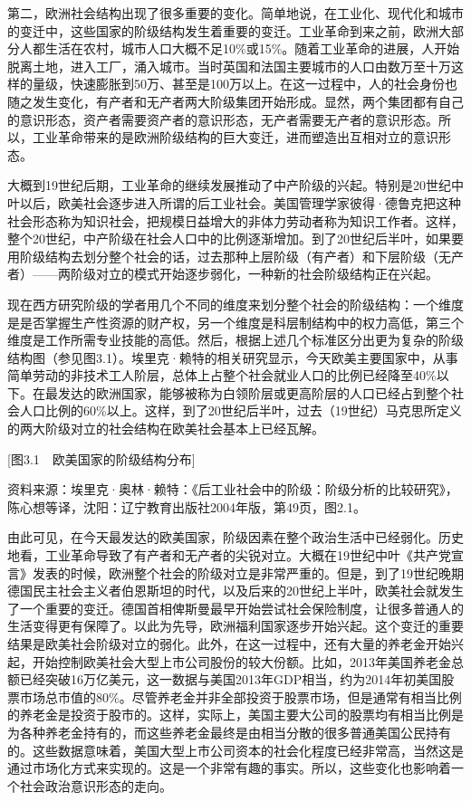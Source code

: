第二，欧洲社会结构出现了很多重要的变化。简单地说，在工业化、现代化和城市的变迁中，这些国家的阶级结构发生着重要的变迁。工业革命到来之前，欧洲大部分人都生活在农村，城市人口大概不足10\%或15\%。随着工业革命的进展，人开始脱离土地，进入工厂，涌入城市。当时英国和法国主要城市的人口由数万至十万这样的量级，快速膨胀到50万、甚至是100万以上。在这一过程中，人的社会身份也随之发生变化，有产者和无产者两大阶级集团开始形成。显然，两个集团都有自己的意识形态，资产者需要资产者的意识形态，无产者需要无产者的意识形态。所以，工业革命带来的是欧洲阶级结构的巨大变迁，进而塑造出互相对立的意识形态。

大概到19世纪后期，工业革命的继续发展推动了中产阶级的兴起。特别是20世纪中叶以后，欧美社会逐步进入所谓的后工业社会。美国管理学家彼得·德鲁克把这种社会形态称为知识社会，把规模日益增大的非体力劳动者称为知识工作者。这样，整个20世纪，中产阶级在社会人口中的比例逐渐增加。到了20世纪后半叶，如果要用阶级结构去划分整个社会的话，过去那种上层阶级（有产者）和下层阶级（无产者）——两阶级对立的模式开始逐步弱化，一种新的社会阶级结构正在兴起。

现在西方研究阶级的学者用几个不同的维度来划分整个社会的阶级结构：一个维度是是否掌握生产性资源的财产权，另一个维度是科层制结构中的权力高低，第三个维度是工作所需专业技能的高低。然后，根据上述几个标准区分出更为复杂的阶级结构图（参见图3.1）。埃里克·赖特的相关研究显示，今天欧美主要国家中，从事简单劳动的非技术工人阶层，总体上占整个社会就业人口的比例已经降至40\%以下。在最发达的欧洲国家，能够被称为白领阶层或更高阶层的人口已经占到整个社会人口比例的60\%以上。这样，到了20世纪后半叶，过去（19世纪）马克思所定义的两大阶级对立的社会结构在欧美社会基本上已经瓦解。

[图3.1　欧美国家的阶级结构分布]

资料来源：埃里克·奥林·赖特：《后工业社会中的阶级：阶级分析的比较研究》，陈心想等译，沈阳：辽宁教育出版社2004年版，第49页，图2.1。

由此可见，在今天最发达的欧美国家，阶级因素在整个政治生活中已经弱化。历史地看，工业革命导致了有产者和无产者的尖锐对立。大概在19世纪中叶《共产党宣言》发表的时候，欧洲整个社会的阶级对立是非常严重的。但是，到了19世纪晚期德国民主社会主义者伯恩斯坦的时代，以及后来的20世纪上半叶，欧美社会就发生了一个重要的变迁。德国首相俾斯曼最早开始尝试社会保险制度，让很多普通人的生活变得更有保障了。以此为先导，欧洲福利国家逐步开始兴起。这个变迁的重要结果是欧美社会阶级对立的弱化。此外，在这一过程中，还有大量的养老金开始兴起，开始控制欧美社会大型上市公司股份的较大份额。比如，2013年美国养老金总额已经突破16万亿美元，这一数据与美国2013年GDP相当，约为2014年初美国股票市场总市值的80\%。尽管养老金并非全部投资于股票市场，但是通常有相当比例的养老金是投资于股市的。这样，实际上，美国主要大公司的股票均有相当比例是为各种养老金持有的，而这些养老金最终是由相当分散的很多普通美国公民持有的。这些数据意味着，美国大型上市公司资本的社会化程度已经非常高，当然这是通过市场化方式来实现的。这是一个非常有趣的事实。所以，这些变化也影响着一个社会政治意识形态的走向。

